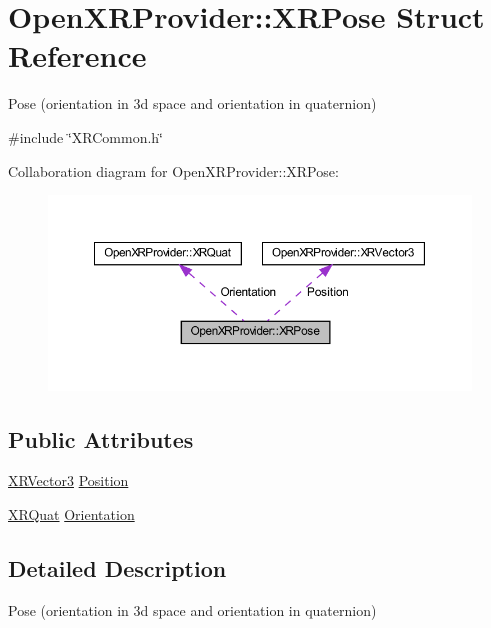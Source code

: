 \hypertarget{struct_open_x_r_provider_1_1_x_r_pose}{}\section{Open\+X\+R\+Provider\+::X\+R\+Pose Struct Reference}
\label{struct_open_x_r_provider_1_1_x_r_pose}


Pose (orientation in 3d space and orientation in quaternion)  




{\ttfamily \#include \char`\"{}X\+R\+Common.\+h\char`\"{}}



Collaboration diagram for Open\+X\+R\+Provider\+::X\+R\+Pose\+:\nopagebreak
\begin{figure}[H]
\begin{center}
\leavevmode
\includegraphics[width=350pt]{struct_open_x_r_provider_1_1_x_r_pose__coll__graph}
\end{center}
\end{figure}
\subsection*{Public Attributes}
\begin{DoxyCompactItemize}
\item 
\mbox{\hyperlink{struct_open_x_r_provider_1_1_x_r_vector3}{X\+R\+Vector3}} \mbox{\hyperlink{struct_open_x_r_provider_1_1_x_r_pose_ac882b1e6289497e3dd59a1befd66afab}{Position}}
\item 
\mbox{\hyperlink{struct_open_x_r_provider_1_1_x_r_quat}{X\+R\+Quat}} \mbox{\hyperlink{struct_open_x_r_provider_1_1_x_r_pose_ab121b9646f6c7afc5530a42e275b040f}{Orientation}}
\end{DoxyCompactItemize}


\subsection{Detailed Description}
Pose (orientation in 3d space and orientation in quaternion) 


